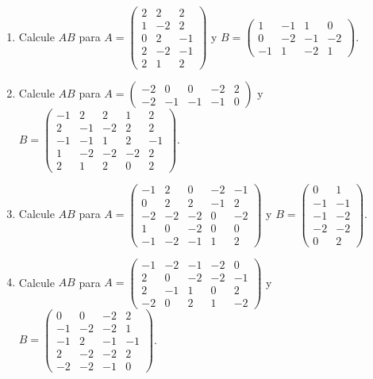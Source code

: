\documentclass[12pt]{article}
\theoremstyle{remark}
\newcounter{contadorEjercicio}
\newenvironment{listaejercicios}{\begin{enumerate}[label=\textbf{E\arabic*.},leftmargin=2.4em,itemsep=0.52em]\setcounter{enumi}{\value{contadorEjercicio}}}{\setcounter{contadorEjercicio}{\value{enumi}}\end{enumerate}}
\begin{document}
\begin{listaejercicios}
\item Calcule $AB$ para $A=\begin{pmatrix}2&2&2\\1&-2&2\\0&2&-1\\2&-2&-1\\2&1&2\end{pmatrix}$ y $B=\begin{pmatrix}1&-1&1&0\\0&-2&-1&-2\\-1&1&-2&1\end{pmatrix}$.

\item Calcule $AB$ para $A=\begin{pmatrix}-2&0&0&-2&2\\-2&-1&-1&-1&0\end{pmatrix}$ y $B=\begin{pmatrix}-1&2&2&1&2\\2&-1&-2&2&2\\-1&-1&1&2&-1\\1&-2&-2&-2&2\\2&1&2&0&2\end{pmatrix}$.

\item Calcule $AB$ para $A=\begin{pmatrix}-1&2&0&-2&-1\\0&2&2&-1&2\\-2&-2&-2&0&-2\\1&0&-2&0&0\\-1&-2&-1&1&2\end{pmatrix}$ y $B=\begin{pmatrix}0&1\\-1&-1\\-1&-2\\-2&-2\\0&2\end{pmatrix}$.

\item Calcule $AB$ para $A=\begin{pmatrix}-1&-2&-1&-2&0\\2&0&-2&-2&-1\\2&-1&1&0&2\\-2&0&2&1&-2\end{pmatrix}$ y $B=\begin{pmatrix}0&0&-2&2\\-1&-2&-2&1\\-1&2&-1&-1\\2&-2&-2&2\\-2&-2&-1&0\end{pmatrix}$.

\end{listaejercicios}
\end{document}
